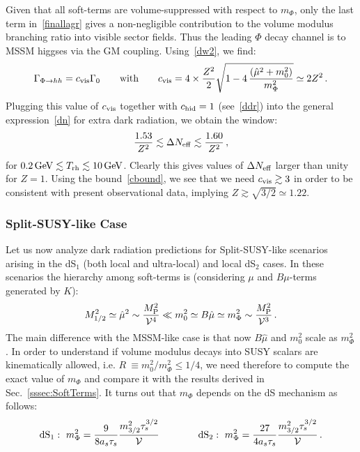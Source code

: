 \documentclass[12pt,a4paper]{book}
\newcommand\vo{{\mathcal{V}}}
\begin{document}
Given that all soft-terms are volume-suppressed with respect to $m_\Phi$, only the last term in~\eqref{finallagr} gives a non-negligible contribution to the volume modulus branching ratio into visible sector fields. Thus the leading $\Phi$ decay channel is to MSSM higgses via the GM coupling. Using~\eqref{dw2}, we find:  
\begin{align}
\label{phihh1}
\Gamma_{\Phi \rightarrow hh} = c_{\rm vis}\Gamma_0\qquad\text{with}\qquad c_{\rm vis}= 4\times\frac{Z^2}{2} \sqrt{1 - 4\,\frac{(\hat\mu^2+m_0^2)}{m_\Phi^2}} \simeq 2 Z^2\,.
\end{align}
Plugging this value of $c_{\rm vis}$ together with $c_{\rm hid}=1$ (see~\eqref{ddr}) into the general expression~\eqref{dn} for extra dark radiation, we obtain the window:
\begin{align}
\frac{1.53}{Z^2}\lesssim \Delta N_{\rm eff}\lesssim  \frac{1.60}{Z^2}\,,
\label{MSSMpred}
\end{align}
for $0.2 \, {\rm GeV} \lesssim T_{\rm rh} \lesssim 10 \, {\rm GeV}$. Clearly this gives values of $\Delta N_{\rm eff}$ larger than unity for $Z = 1$. Using the bound~\eqref{cbound}, we see that we need $c_{\rm vis}\gtrsim 3$ in order to be consistent with present observational data, implying $Z\gtrsim \sqrt{3/2}\simeq 1.22$.

\subsubsection{Split-SUSY-like Case}
\label{splitsusycase}

Let us now analyze dark radiation predictions for Split-SUSY-like scenarios arising in the dS$_1$ (both local and ultra-local) and local dS$_2$ cases.
In these scenarios the hierarchy among soft-terms is (considering $\mu$ and $B\mu$-terms generated by $K$):
\begin{align}
\label{hierarchyss}
M_{1/2}^2 \simeq \hat{\mu}^2 \sim \frac{M_{\rm P}^2}{\vo^4} \ll m_0^2 \simeq B\hat\mu \simeq m_{\Phi}^2 \sim \frac{M_{\rm P}^2}{\vo^3}\,.
\end{align}
The main difference with the MSSM-like case is that now $B\hat\mu$ and $m_0^2$ scale as $m_\Phi^2$. In order to understand if volume modulus decays into SUSY scalars are kinematically allowed, i.e. $R~\equiv m^2_0/m_\Phi^2 \leq 1/4$, we need therefore to compute the exact value of $m_\Phi$ and compare it with the results derived in Sec.~\ref{sssec:SoftTerms}. It turns out that $m_\Phi$ depends on the dS mechanism as follows:
\begin{align}
{\rm dS}_1: \,\, m_\Phi^2 = \frac{9}{8 a_s\tau_s} \frac{m_{3/2}^2\tau_s^{3/2}}{\vo} \qquad\qquad 
{\rm dS}_2: \,\, m_\Phi^2 = \frac{27}{4 a_s\tau_s} \frac{m_{3/2}^2\tau_s^{3/2}}{\vo}\,.
\label{vmm}
\end{align}
\end{document}
